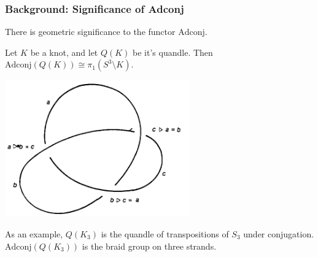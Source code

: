 \documentclass[10pt]{beamer}
\newcommand{\Adconj}{\mathrm{Adconj}} %
\theoremstyle{plain}
\begin{document}
    \begin{frame}
        \frametitle[allowframebreaks]{Background: Significance of Adconj}

        There is geometric significance to the functor $\Adconj$.

        \begin{theorem}
            Let $K$ be a knot, and let $Q(K)$ be it's quandle. Then $ \Adconj(Q(K)) \cong \pi_1(S^3\setminus K)$. \cite{birrell2007knot}
        \end{theorem}

        \includegraphics[scale = 1]{figures/taitQuandle.png}

        \begin{example}
        As an example, $ Q(K_3) $ is the quandle of transpositions of $S_3$ under conjugation. $ \Adconj(Q(K_3)) $ is the braid group on three strands.
        \end{example} \cite{wikipediaKnotGroup}
    \end{frame}
\end{document}
